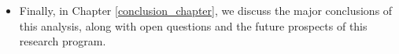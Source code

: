 \begin{itemize}

\item Finally, in Chapter \ref{conclusion_chapter}, we discuss the major conclusions of this analysis, along with open questions and the future prospects of this research program.


\end{itemize}
